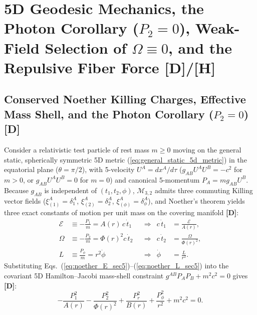 \documentclass[11pt,a4paper]{article}
\newcommand{\catD}{\textbf{\textcolor{blue!75!black}{[D]}}}
\newcommand{\catH}{\textbf{\textcolor{orange!85!black}{[H]}}}
\theoremstyle{definition}
\theoremstyle{remark}
\begin{document}
\section{\texorpdfstring{5D Geodesic Mechanics, the Photon Corollary ($P_2 = 0$), Weak-Field Selection of $\Omega \equiv 0$, and the Repulsive Fiber Force \catD/\catH}{5D Geodesic Mechanics, the Photon Corollary, Weak-Field Selection of Omega = 0, and the Repulsive Fiber Force}}
\label{sec:geodesics}

\subsection{\texorpdfstring{Conserved Noether Killing Charges, Effective Mass Shell, and the Photon Corollary ($P_2 = 0$) \catD}{Conserved Noether Killing Charges, Effective Mass Shell, and the Photon Corollary}}

Consider a relativistic test particle of rest mass $m \ge 0$ moving on the general static, spherically symmetric 5D metric (\ref{eq:general_static_5d_metric}) in the equatorial plane ($\theta = \pi/2$), with 5-velocity $U^A = dx^A/d\tau$ ($g_{AB}U^A U^B = -c^2$ for $m > 0$, or $g_{AB}U^A U^B = 0$ for $m = 0$) and canonical 5-momentum $P_A = m g_{AB}U^B$. Because $g_{AB}$ is independent of $(t_1, t_2, \phi)$, $\mathcal{M}_{3,2}$ admits three commuting Killing vector fields ($\xi_{(1)}^A = \delta_1^A$, $\xi_{(2)}^A = \delta_2^A$, $\xi_{(\phi)}^A = \delta_{\phi}^A$), and Noether's theorem yields three exact constants of motion per unit mass on the covering manifold \catD:
\begin{align}
  \mathcal{E} &\equiv -\frac{P_1}{m} = A(r)\,c\,\dot{t}_1 && \Longrightarrow & c\,\dot{t}_1 &= \frac{\mathcal{E}}{A(r)}, \label{eq:noether_E_sec5} \\[3pt]
  \Omega &\equiv -\frac{P_2}{m} = \Phi(r)^2 c\,\dot{t}_2 && \Longrightarrow & c\,\dot{t}_2 &= \frac{\Omega}{\Phi(r)^2}, \label{eq:noether_Omega_sec5} \\[3pt]
  L &\equiv \frac{P_{\phi}}{m} = r^2\dot{\phi} && \Longrightarrow & \dot{\phi} &= \frac{L}{r^2}. \label{eq:noether_L_sec5}
\end{align}
Substituting Eqs.~(\ref{eq:noether_E_sec5})--(\ref{eq:noether_L_sec5}) into the covariant 5D Hamilton--Jacobi mass-shell constraint $g^{AB}P_A P_B + m^2 c^2 = 0$ gives \catD:
\begin{equation}
  -\frac{P_1^2}{A(r)} - \frac{P_2^2}{\Phi(r)^2} + \frac{P_r^2}{B(r)} + \frac{P_{\phi}^2}{r^2} + m^2 c^2 = 0.
  \label{eq:5d_mass_shell_sec5}
\end{equation}
\end{document}
